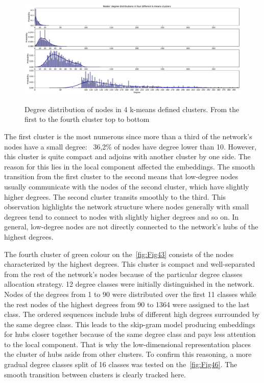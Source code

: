 \begin{figure}[!ht]
	\centering
	\includegraphics[width=1.0\textwidth]{images/evaluations/Fig44.pdf}\\
	\caption{Degree distribution of nodes in 4 k-means defined clusters. From the first to the fourth cluster top to bottom}
	\label{fig:Fig44}
\end{figure}

The first cluster is the most numerous since more than a third of the network's nodes have a small degree: ~36,2\% of nodes have degree lower than 10. However, this cluster is quite compact and adjoins with another cluster by one side. The reason for this lies in the local component affected the embeddings. The smooth transition from the first cluster to the second means that low-degree nodes usually communicate with the nodes of the second cluster, which have slightly higher degrees. The second cluster transits smoothly to the third. This observation highlights the network structure where nodes generally with small degrees tend to connect to nodes with slightly higher degrees and so on. In general, low-degree nodes are not directly connected to the network's hubs of the highest degrees. 

The fourth cluster of green colour on the~\autoref{fig:Fig43} consists of the nodes characterized by the highest degrees. This cluster is compact and well-separated from the rest of the network's nodes because of the particular degree classes allocation strategy. 12 degree classes were initially distinguished in the network. Nodes of the degrees from 1 to 90 were distributed over the first 11 classes while the rest nodes of the highest degrees from 90 to 1364 were assigned to the last class. The ordered sequences include hubs of different high degrees surrounded by the same degree class. This leads to the skip-gram model producing embeddings for hubs closer together because of the same degree class and pays less attention to the local component. That is why the low-dimensional representation places the cluster of hubs aside from other clusters. To confirm this reasoning, a more gradual degree classes split of 16 classes was tested on the~\autoref{fig:Fig46}. The smooth transition between clusters is clearly tracked here.

